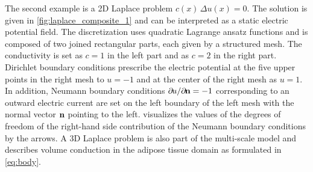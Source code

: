 The second example is a 2D Laplace problem $c(x)\,\Delta u(x) = 0$. The solution is given in \cref{fig:laplace_composite_1} and can be interpreted as a static electric potential field. 
The discretization uses quadratic Lagrange ansatz functions and is composed of two joined rectangular parts, each given by a structured mesh. The conductivity is set as $c=1$ in the left part and as $c=2$ in the right part. Dirichlet boundary conditions prescribe the electric potential at the five upper points in the right mesh to $u = -1$ and at the center of the right mesh as $u=1$. In addition, Neumann boundary conditions $\partial u / \partial \bfn = -1$ corresponding to an outward electric current are set on the left boundary of the left mesh with the normal vector $\textbf{n}$ pointing to the left.  visualizes the values of the degrees of freedom of the right-hand side contribution of the Neumann boundary conditions by the arrows. 
A 3D Laplace problem is also part of the multi-scale model and describes volume conduction in the adipose tissue domain as formulated in \cref{eq:body}.

